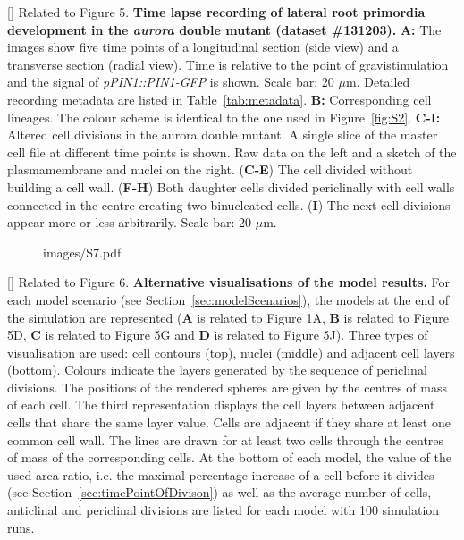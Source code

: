 \clearpage
{}[]{
Related to Figure 5.
{\bf Time lapse recording of lateral root primordia development in the \emph{aurora} double mutant (dataset \#131203).}
{\bf A:} The images show five time points of a longitudinal section (side view) and a transverse section (radial view). Time is relative to the point of gravistimulation and the signal of \emph{pPIN1::PIN1-GFP }is shown. Scale bar: 20 $\mu$m. Detailed recording metadata are listed in Table~\ref{tab:metadata}. {\bf B:} Corresponding cell lineages. The colour scheme is identical to the one used in Figure~\ref{fig:S2}. {\bf C-I:} Altered cell divisions in the aurora double mutant. A single slice of the master cell file at different time points is shown. Raw data on the left and a sketch of the plasmamembrane and nuclei on the right. (\textbf{C-E}) The cell divided without building a cell wall. (\textbf{F-H}) Both daughter cells divided periclinally with cell walls connected in the centre creating two binucleated cells. (\textbf{I}) The next cell divisions appear more or less arbitrarily. Scale bar: 20 $\mu$m.
}
\label{fig:S6}
%
\clearpage
%
\begin{figure}[htbp]
\centering
	\begin{overpic}[width=1.\linewidth]{images/S7.pdf}
	\end{overpic}
\end{figure}
\clearpage
{}[]{
Related to Figure 6.
{\bf Alternative visualisations of the model results.} For each model scenario (see Section~\ref{sec:modelScenarios}), the models at the end of the simulation are represented (\textbf{A} is related to Figure 1A, \textbf{B} is related to Figure 5D, \textbf{C} is related to Figure 5G and \textbf{D} is related to Figure 5J). Three types of visualisation are used: cell contours (top), nuclei (middle) and adjacent cell layers (bottom). Colours indicate the layers generated by the sequence of periclinal divisions. The positions of the rendered spheres are given by the centres of mass of each cell. The third representation displays the cell layers between adjacent cells that share the same layer value. Cells are adjacent if they share at least one common cell wall. The lines are drawn for at least two cells through the centres of mass of the corresponding cells. At the bottom of each model, the value of the used area ratio, i.e. the maximal percentage increase of a cell before it divides (see Section~\ref{sec:timePointOfDivison}) as well as the average number of cells, anticlinal and periclinal divisions are listed for each model with 100 simulation runs.
}
\label{fig:S7}
%
\clearpage


